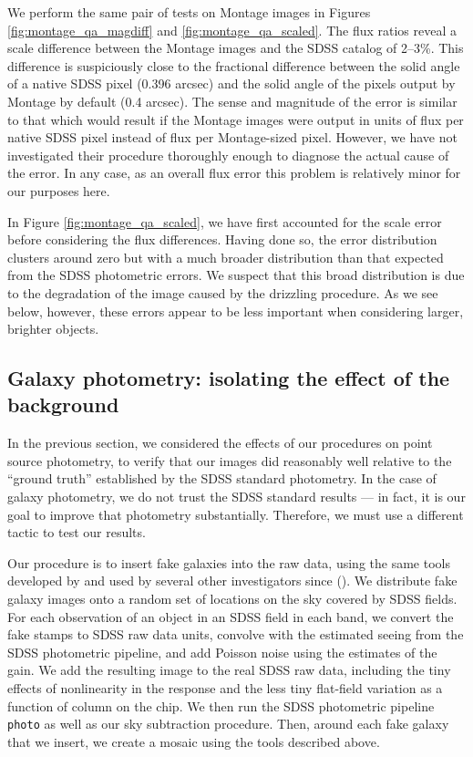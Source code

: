 \documentclass[10pt,preprint]{aastex}
\begin{document}
We perform the same pair of tests on Montage images in Figures
\ref{fig:montage_qa_magdiff} and \ref{fig:montage_qa_scaled}.  The
flux ratios reveal a scale difference between the Montage
images and the SDSS catalog of 2--3\%. This difference is suspiciously
close to the fractional difference between the solid angle of a native
SDSS pixel (0.396 arcsec) and the solid angle of the pixels output by
Montage by default (0.4 arcsec).  The sense and magnitude of the error
is similar to that which would result if the Montage images were
output in units of flux per native SDSS pixel instead of flux per
Montage-sized pixel. However, we have not investigated their procedure
thoroughly enough to diagnose the actual cause of the error.  In any
case, as an overall flux error this problem is relatively minor for
our purposes here.

In Figure \ref{fig:montage_qa_scaled}, we have first accounted for the
scale error before considering the flux differences. Having done so,
the error distribution clusters around zero but with a much broader
distribution than that expected from the SDSS photometric errors.  We
suspect that this broad distribution is due to the degradation of the
image caused by the drizzling procedure. As we see below, however,
these errors appear to be less important when considering larger,
brighter objects.

\subsection{ Galaxy photometry: isolating the effect of the background}
\label{sec:simplegal}

In the previous section, we considered the effects of our procedures
on point source photometry, to verify that our images did reasonably
well relative to the ``ground truth'' established by the SDSS standard
photometry.  In the case of galaxy photometry, we do not trust the
SDSS standard results --- in fact, it is our goal to improve that
photometry substantially.  Therefore, we must use a different tactic
to test our results.

Our procedure is to insert fake galaxies into the raw data, using the
same tools developed by \citet{blanton05b} and used by several other
investigators since (\citealt{blanton04b, mandelbaum06a, masjedi06a}).
We distribute fake galaxy images onto a random set of locations on the
sky covered by SDSS fields. For each observation of an object in an
SDSS field in each band, we convert the fake stamps to SDSS raw data
units, convolve with the estimated seeing from the SDSS photometric
pipeline, and add Poisson noise using the estimates of the gain. We
add the resulting image to the real SDSS raw data, including the tiny
effects of nonlinearity in the response and the less tiny flat-field
variation as a function of column on the chip. We then run the SDSS
photometric pipeline {\tt photo} as well as our sky subtraction
procedure. Then, around each fake galaxy that we insert, we create a
mosaic using the tools described above.
\end{document}
